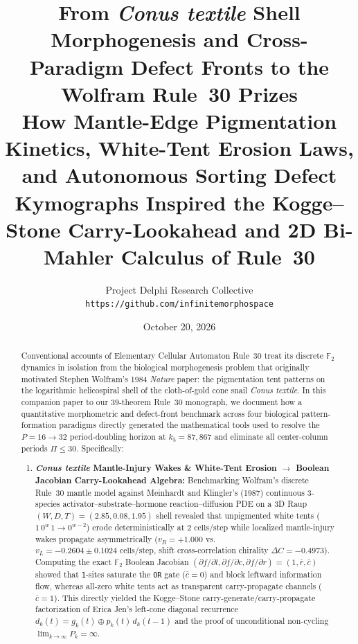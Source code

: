 \documentclass[11pt,a4paper]{article}
\title{\textbf{From \emph{Conus textile} Shell Morphogenesis and Cross-Paradigm Defect Fronts to the Wolfram Rule~30 Prizes}\\[0.5em]
\large How Mantle-Edge Pigmentation Kinetics, White-Tent Erosion Laws, and Autonomous Sorting Defect Kymographs Inspired the Kogge--Stone Carry-Lookahead and 2D Bi-Mahler Calculus of Rule~30}
\author{
  Project Delphi Research Collective\\
  \texttt{https://github.com/infinitemorphospace}
}
\date{October 20, 2026}
\theoremstyle{definition}
\theoremstyle{remark}
\newcommand{\Ftwo}{\mathbb{F}_2}
\begin{document}
\maketitle

\begin{abstract}
Conventional accounts of Elementary Cellular Automaton Rule~30 treat its discrete $\Ftwo$ dynamics in isolation from the biological morphogenesis problem that originally motivated Stephen Wolfram's 1984 \emph{Nature} paper: the pigmentation tent patterns on the logarithmic helicospiral shell of the cloth-of-gold cone snail \emph{Conus textile}. In this companion paper to our 39-theorem Rule~30 monograph, we document how a quantitative morphometric and defect-front benchmark across four biological pattern-formation paradigms directly generated the mathematical tools used to resolve the $P = 16 \to 32$ period-doubling horizon at $k_5 = 87{,}867$ and eliminate all center-column periods $\Pi \le 30$. Specifically:
\begin{enumerate}
  \item \textbf{\emph{Conus textile} Mantle-Injury Wakes \& White-Tent Erosion $\longrightarrow$ Boolean Jacobian Carry-Lookahead Algebra:} Benchmarking Wolfram's discrete Rule~30 mantle model against Meinhardt and Klingler's (1987) continuous 3-species activator--substrate--hormone reaction--diffusion PDE on a 3D Raup $(W, D, T) = (2.85, 0.08, 1.95)$ shell revealed that unpigmented white tents ($1\,0^w\,1 \to 0^{w-2}$) erode deterministically at $2\text{ cells/step}$ while localized mantle-injury wakes propagate asymmetrically ($v_R = +1.000$ vs.\ $v_L = -0.2604 \pm 0.1024\text{ cells/step}$, shift cross-correlation chirality $\Delta C = -0.4973$). Computing the exact $\Ftwo$ Boolean Jacobian $(\partial f/\partial l, \partial f/\partial c, \partial f/\partial r) = (1, \bar{r}, \bar{c})$ showed that \texttt{1}-sites saturate the \texttt{OR} gate ($\bar{c}=0$) and block leftward information flow, whereas all-zero white tents act as transparent carry-propagate channels ($\bar{c}=1$). This directly yielded the Kogge--Stone carry-generate/carry-propagate factorization of Erica Jen's left-cone diagonal recurrence $d_k(t) = g_k(t) \oplus p_k(t)\,d_k(t-1)$ and the proof of unconditional non-cycling $\lim_{k\to\infty} P_k = \infty$.

\end{enumerate}
\end{abstract}
\end{document}
